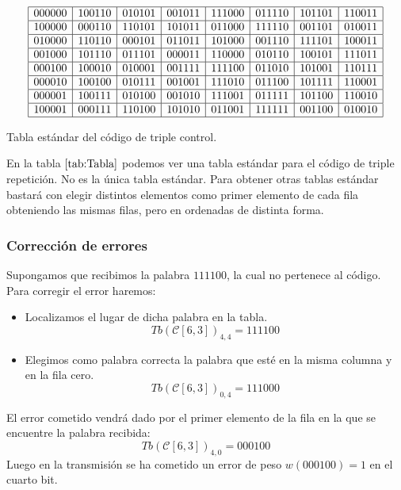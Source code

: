 %
%
\begin{table}[!h]
\begin{displaymath}
\begin{array}{|c|c|c|c|c|c|c|c|}
\hline
000000&100110&010101&001011&111000&011110&101101&110011\\
\hline
100000&000110&110101&101011&011000&111110&001101&010011\\
\hline
010000&110110&000101&011011&101000&001110&111101&100011\\
\hline
001000&101110&011101&000011&110000&010110&100101&111011\\
\hline
000100&100010&010001&001111&111100&011010&101001&110111\\
\hline
000010&100100&010111&001001&111010&011100&101111&110001\\
\hline
000001&100111&010100&001010&111001&011111&101100&110010\\
\hline
100001&000111&110100&101010&011001&111111&001100&010010\\
\hline
\end{array}
\end{displaymath}
\caption{Tabla est\'andar del c\'odigo de triple control.}\label{tab:Tabla}
\end{table}
%
%
En la tabla $\ref{tab:Tabla}$ podemos ver una tabla est\'andar para el c\'odigo
de triple repetici\'on. No es la \'unica tabla est\'andar. Para obtener otras
tablas est\'andar bastar\'a con elegir distintos elementos como primer elemento
de cada fila obteniendo las mismas filas, pero en ordenadas de distinta forma.
%
\newpage
%
\subsubsection{Correcci\'on de errores}

Supongamos que recibimos la palabra $111100$, la cual no pertenece al c\'odigo.
Para corregir el error haremos:
\begin{itemize}
\item Localizamos el lugar de dicha palabra en la tabla.
\begin{displaymath}
Tb(\mathcal{C}[6,3])_{4,4}=111100
\end{displaymath}
\item Elegimos como palabra correcta la palabra que est\'e en la misma columna y
en la fila cero.
\begin{displaymath}
Tb(\mathcal{C}[6,3])_{0,4}=111000
\end{displaymath}
\end{itemize}
El error cometido vendr\'a dado por el primer elemento de la fila en la que se
encuentre la palabra recibida:
\begin{displaymath}
Tb(\mathcal{C}[6,3])_{4,0}=000100
\end{displaymath}
Luego en la transmisi\'on se ha cometido un error de peso $w(000100)=1$ en el
cuarto bit.

